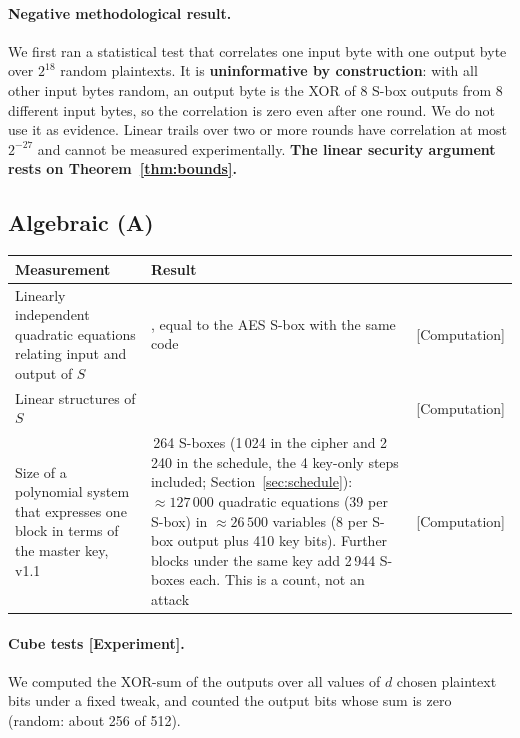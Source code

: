 \documentclass[11pt,a4paper]{article}
\newcommand{\ev}[1]{\textup{\textsf{[#1]}}}
\begin{document}
\paragraph{Negative methodological result.} We first ran a statistical test that correlates one input byte with
one output byte over $2^{18}$ random plaintexts. It is \textbf{uninformative by construction}: with all other
input bytes random, an output byte is the XOR of 8 S-box outputs from 8 different input bytes, so the
correlation is zero even after one round. We do not use it as evidence. Linear trails over two or more rounds
have correlation at most $2^{-27}$ and cannot be measured experimentally. \textbf{The linear security argument
rests on Theorem~\ref{thm:bounds}.}

\subsection{Algebraic (A)}

\begin{center}\small
\begin{tabularx}{\textwidth}{@{}>{\raggedright\arraybackslash}X>{\raggedright\arraybackslash}Xl@{}}
\toprule
Measurement & Result & \\
\midrule
Linearly independent quadratic equations relating input and output of $S$ & 39, equal to the AES S-box with the
  same code & \ev{Computation}\\
Linear structures of $S$ & 0 & \ev{Computation}\\
Size of a polynomial system that expresses one block in terms of the master key, v1.1 & 3\,264 S-boxes (1\,024 in
  the cipher and 2\,240 in the schedule, the 4 key-only steps included; Section~\ref{sec:schedule}):
  $\approx 127\,000$ quadratic equations (39 per S-box) in $\approx 26\,500$ variables (8 per S-box output plus
  410 key bits). Further blocks under the same key add 2\,944 S-boxes each. This is a count, not an attack &
  \ev{Computation}\\
\bottomrule
\end{tabularx}
\end{center}

\paragraph{Cube tests \ev{Experiment}.} We computed the XOR-sum of the outputs over all values of $d$ chosen
plaintext bits under a fixed tweak, and counted the output bits whose sum is zero (random: about 256 of 512).
\end{document}
